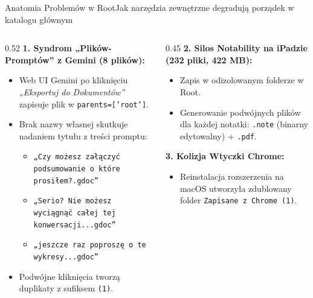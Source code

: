 \documentclass[aspectratio=169, 10pt]{beamer}
\begin{document}
\begin{frame}{Anatomia Problemów w Root}{Jak narzędzia zewnętrzne degradują porządek w katalogu głównym}
  \begin{columns}[T]
    \begin{column}{0.52\textwidth}
      \textbf{1. Syndrom „Plików-Promptów” z Gemini (8 plików):}
      \begin{itemize}
        \item Web UI Gemini po kliknięciu \textit{„Eksportuj do Dokumentów”} zapisuje plik w \texttt{parents=['root']}.
        \item Brak nazwy własnej skutkuje nadaniem tytułu z treści promptu:
        \begin{itemize}\tiny
          \item \texttt{„Czy możesz załączyć podsumowanie o które prosiłem?.gdoc”}
          \item \texttt{„Serio? Nie możesz wyciągnąć całej tej konwersacji...gdoc”}
          \item \texttt{„jeszcze raz poproszę o te wykresy...gdoc”}
        \end{itemize}
        \item Podwójne kliknięcia tworzą duplikaty z sufiksem \texttt{(1)}.
      \end{itemize}
    \end{column}

    \begin{column}{0.45\textwidth}
      \textbf{2. Silos Notability na iPadzie (232 pliki, 422 MB):}
      \begin{itemize}
        \item Zapis w odizolowanym folderze w Root.
        \item Generowanie podwójnych plików dla każdej notatki: \texttt{.note} (binarny edytowalny) + \texttt{.pdf}.
      \end{itemize}

      \vspace{0.2cm}
      \textbf{3. Kolizja Wtyczki Chrome:}
      \begin{itemize}
        \item Reinstalacja rozszerzenia na macOS utworzyła zdublowany folder \texttt{Zapisane z Chrome (1)}.
      \end{itemize}
    \end{column}
  \end{columns}
\end{frame}
\end{document}
